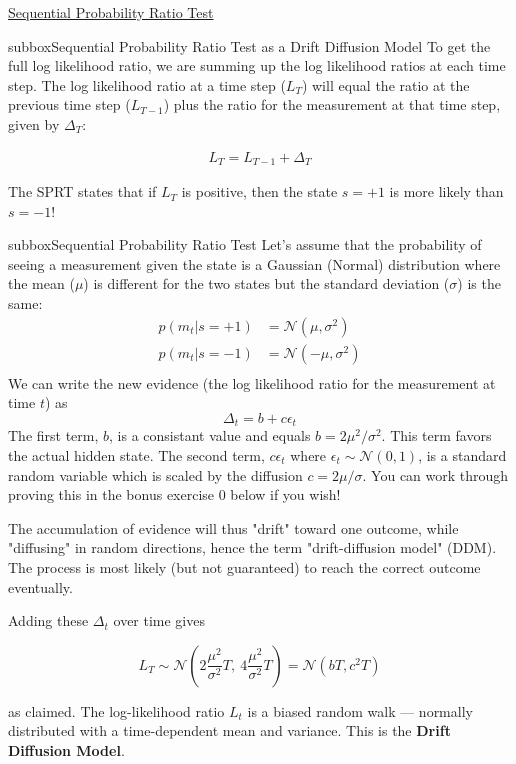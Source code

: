 \begin{textbox}{\href{https://compneuro.neuromatch.io/tutorials/W3D2_HiddenDynamics/student/W3D2_Tutorial1.html}{Sequential Probability Ratio Test }   }

\begin{subbox}{subbox}{Sequential Probability Ratio Test as a Drift Diffusion Model}
\scriptsize
To get the full log likelihood ratio, we are summing up the log likelihood ratios at each time step. The log likelihood ratio at a time step ($L_T$) will equal the ratio at the previous time step ($L_{T-1}$) plus the ratio for the measurement at that time step, given by $\Delta_T$:

\begin{align*}
L_T =  L_{T-1} + \Delta_T
\end{align*}

The SPRT states that if $L_T$ is positive, then the state $s=+1$ is more likely than $s=-1$! 

\end{subbox}

\begin{subbox}{subbox}{Sequential Probability Ratio Test}
\scriptsize
Let's assume that the probability of seeing a measurement given the state is a Gaussian (Normal) distribution where the mean ($\mu$) is different for the two states but the standard deviation ($\sigma$) is the same:
\begin{align*}
p(m_t | s = +1) &= \mathcal{N}(\mu, \sigma^2)\\
p(m_t | s = -1) &= \mathcal{N}(-\mu, \sigma^2)\\
\end{align*}
We can write the new evidence (the log likelihood ratio for the measurement at time $t$) as
$$\Delta_t=b+c\epsilon_t$$
The first term, $b$, is a consistant value and equals $b=2\mu^2/\sigma^2$. This term favors the actual hidden state. The second term, $c\epsilon_t$ where $\epsilon_t\sim\mathcal{N}(0,1)$, is a standard random variable which is scaled by the diffusion $c=2\mu/\sigma$. You can work through proving this in the bonus exercise 0 below if you wish!

The accumulation of evidence will thus "drift" toward one outcome, while "diffusing" in random directions, hence the term "drift-diffusion model" (DDM). The process is most likely (but not guaranteed) to reach the correct outcome eventually.

Adding these $\Delta_t$ over time gives

\begin{equation*}
L_T\sim\mathcal{N}\left(2\frac{\mu^2}{\sigma^2}T,\ 4\frac{\mu^2}{\sigma^2}T\right)=\mathcal{N}(bT,c^2T)
\end{equation*}

as claimed. The log-likelihood ratio $L_t$ is a biased random walk --- normally distributed with a time-dependent mean and variance. This is the \textbf{Drift Diffusion Model}.

\end{subbox}
\end{textbox}
